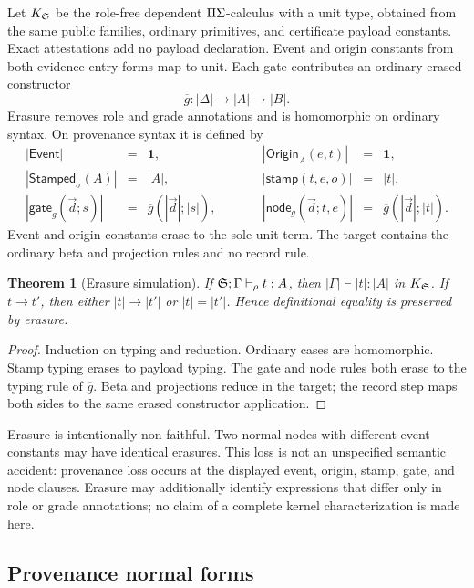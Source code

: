\documentclass[11pt]{article}
\numberwithin{equation}{section}
\theoremstyle{definition}
\theoremstyle{plain}
\newtheorem{theorem}[definition]{Theorem}
\theoremstyle{remark}
\newcommand{\Event}{\mathsf{Event}}
\newcommand{\Origin}{\mathsf{Origin}}
\newcommand{\Stamped}{\mathsf{Stamped}}
\begin{document}
Let \(K_{\mathfrak S}\) be the role-free dependent \(\Pi\Sigma\)-calculus with a
unit type, obtained from the same public families, ordinary primitives, and
certificate payload constants.  Exact attestations add no payload
declaration.  Event and origin constants from both evidence-entry forms map to unit.
Each gate contributes
an ordinary erased constructor
\[
  \overline g:|\Delta|\to|A|\to|B|.
\]
Erasure removes role and grade annotations and is homomorphic on ordinary
syntax.  On provenance syntax it is defined by
\[
\begin{array}{rclcrcl}
|\Event|&=&\mathbf 1,
&\qquad&|\Origin_A(e,t)|&=&\mathbf 1,\\
|\Stamped_\sigma(A)|&=&|A|,
&&|\mathsf{stamp}(t,e,o)|&=&|t|,\\
|\mathsf{gate}_g(\vec d;s)|&=&
 \overline g(|\vec d|;|s|),
&&|\mathsf{node}_g(\vec d;t,e)|&=&
 \overline g(|\vec d|;|t|).
\end{array}
\]
Event and origin constants erase to the sole unit term.  The target contains
the ordinary beta and projection rules and no record rule.

\begin{theorem}[Erasure simulation]\label{thm:erasure}
If \({\mathfrak S};\Gamma\vdash_{\rho} t:A\), then
\(|\Gamma|\vdash|t|:|A|\) in \(K_{\mathfrak S}\).  If
\(t\longrightarrow t'\), then either
\(|t|\longrightarrow|t'|\) or \(|t|=|t'|\).  Hence definitional equality is
preserved by erasure.
\end{theorem}

\begin{proof}
Induction on typing and reduction.  Ordinary cases are homomorphic.  Stamp
typing erases to payload typing.  The gate and node rules both erase to the
typing rule of \(\overline g\).  Beta and projections reduce in the target;
the record step maps both sides to the same erased constructor application.
\end{proof}

Erasure is intentionally non-faithful.  Two normal nodes with different event
constants may have identical erasures.  This loss is not an unspecified
semantic accident: provenance loss occurs at the displayed event, origin,
stamp, gate, and node clauses.  Erasure may additionally identify expressions
that differ only in role or grade annotations; no claim of a complete kernel
characterization is made here.

\subsection{Provenance normal forms}
\end{document}
